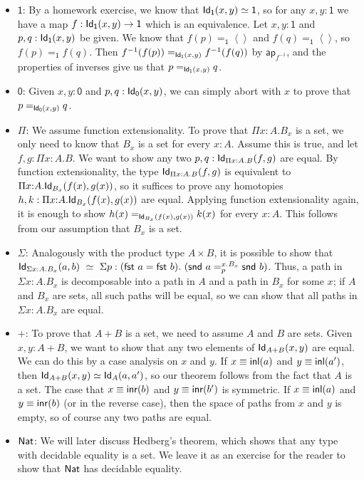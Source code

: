 \documentclass[11pt]{article}
\newcommand*{\Void}{\mathsf{0}}
\newcommand*{\Unit}{\mathsf{1}}
\newcommand*{\ap}{\mathsf{ap}}
\begin{document}
\begin{itemize}
\item 
  $\Unit$: By a homework exercise, we know that $\Id{\Unit}(x,y) \simeq \Unit$, so for any $x,y : \Unit$ we have a map $f : \Id{\Unit}(x,y) \to \Unit$ which is an equivalence. Let $x,y : \Unit$ and $p, q : \Id{\Unit}(x,y)$ be given. We know that $f(p) =_\Unit \left<\right>$ and $f(q) =_\Unit \left<\right>$, so $f(p) =_\Unit f(q)$. Then $f^{-1}(f(p)) =_{\Id{\Unit}(x,y)} f^{-1}(f(q))$ by $\ap_{f^{-1}}$, and the properties of inverses give us that $p =_{\Id{\Unit}(x,y)} q$.
\item
  $\Void$: Given $x,y : \Void$ and $p, q : \Id{\Void}(x,y)$, we can simply abort with $x$ to prove that $p =_{\Id{\Void}(x,y)} q$.
\item
  $\Pi$: We assume function extensionality. To prove that $\Pi x{:}A. B_x$ is a set, we only need to know that $B_x$ is a set for every $x{:}A$. Assume this is true, and let $f, g : \Pi x{:}A. B$. We want to show any two $p, q : \mathsf{Id}_{\Pi x {:}A. B}(f,g)$ are equal. By function extensionality, the type $\mathsf{Id}_{\Pi x {:}A. B}(f,g)$ is equivalent to $\Pi x{:}A. \mathsf{Id}_{B_x}(f(x), g(x))$, so it suffices to prove any homotopies $h, k : \Pi x{:}A. \mathsf{Id}_{B_x}(f(x), g(x))$ are equal. Applying function extensionality again, it is enough to show $h(x) =_{\mathsf{Id}_{B_x}(f(x),g(x))} k(x)$ for every $x{:}A$. This follows from our assumption that $B_x$ is a set.
\item
  $\Sigma$: Analogously with the product type $A \times B$, it is possible to show that $\mathsf{Id}_{\Sigma x{:}A. B_x}(a,b)~\simeq~\Sigma p : (\textsf{fst}~a = \textsf{fst}~b).~(\textsf{snd}~a =^{x.B_x}_p \textsf{snd}~b)$. Thus, a path in $\Sigma x{:}A. B_x$ is decomposable into a path in $A$ and a path in $B_x$ for some $x$; if $A$ and $B_x$ are sets, all such paths will be equal, so we can show that all paths in $\Sigma x{:}A. B_x$ are equal.
\item
  $+$: To prove that $A + B$ is a set, we need to assume $A$ and $B$ are sets. Given $x,y : A + B$, we want to show that any two elements of $\mathsf{Id}_{A + B}(x,y)$ are equal. We can do this by a case analysis on $x$ and $y$. If $x \equiv {\mathsf{inl}}(a)$ and $y \equiv {\mathsf{inl}}(a')$, then $\mathsf{Id}_{A + B}(x,y) \simeq \mathsf{Id}_{A}(a,a')$, so our theorem follows from the fact that $A$ is a set. The case that $x \equiv {\mathsf{inr}}(b)$ and $y \equiv {\mathsf{inr}}(b')$ is symmetric. If $x \equiv {\mathsf{inl}}(a)$ and $y \equiv {\mathsf{inr}}(b)$ (or in the reverse case), then the space of paths from $x$ and $y$ is empty, so of course any two paths are equal.
\item
  $\mathsf{Nat}$: We will later discuss Hedberg's theorem, which shows that any type with decidable equality is a set. We leave it as an exercise for the reader to show that $\mathsf{Nat}$ has decidable equality.
\end{itemize}
\end{document}
